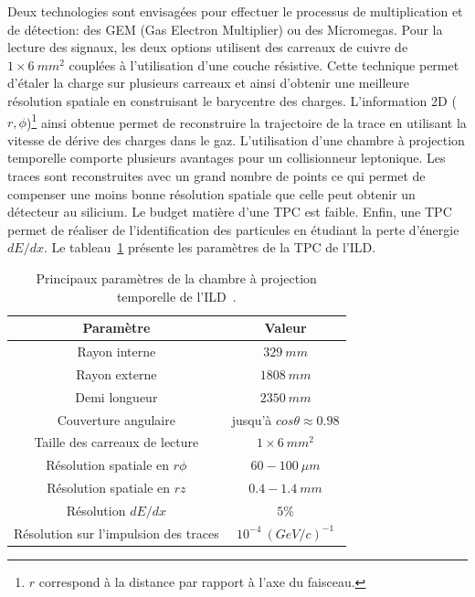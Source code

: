 Deux technologies sont envisagées pour effectuer le processus de multiplication et de détection: des GEM (Gas Electron Multiplier) ou des Micromegas. Pour la lecture des signaux, les deux options utilisent des carreaux de cuivre de $1\times6~mm^2$ couplées à l'utilisation d'une couche résistive. Cette technique permet d'étaler la charge sur plusieurs carreaux et ainsi d'obtenir une meilleure résolution spatiale en construisant le barycentre des charges. L'information 2D ($r,\phi$)\footnote{$r$ correspond à la distance par rapport à l'axe du faisceau.} ainsi obtenue permet de reconstruire la trajectoire de la trace en utilisant la vitesse de dérive des charges dans le gaz. L'utilisation d'une chambre à projection temporelle comporte plusieurs avantages pour un collisionneur leptonique. Les traces sont reconstruites avec un grand nombre de points ce qui permet de compenser une moins bonne résolution spatiale que celle peut obtenir un détecteur au silicium. Le budget matière d'une TPC est faible. Enfin, une TPC permet de réaliser de l'identification des particules en étudiant la perte d'énergie $dE/dx$. Le tableau~\ref{tab.tpc-params} présente les paramètres de la TPC de l'ILD.
\begin{table}[!ht]
  \begin{center}
    \begin{tabular}{c|c}
      \rowcolor{black!20!white} Paramètre & Valeur \\
      \hline
      \rowcolor{black!5!white} Rayon interne & $329~mm$ \\
      \rowcolor{black!5!white} Rayon externe & $1808~mm$ \\
      \rowcolor{black!5!white} Demi longueur & $2350~mm$ \\
      \rowcolor{black!5!white} Couverture angulaire & jusqu'à $cos\theta\approx0.98$ \\
      \rowcolor{black!5!white} Taille des carreaux de lecture & $1\times6~mm^2$ \\
      \hline
      \rowcolor{black!5!white} Résolution spatiale en $r\phi$ & $60-100~\mu m$ \\
      \rowcolor{black!5!white} Résolution spatiale en $rz$ & $0.4-1.4~mm$ \\
      \rowcolor{black!5!white} Résolution $dE/dx$ & $5\%$ \\
      \rowcolor{black!5!white} Résolution sur l'impulsion des traces & $10^{-4}~(GeV/c)^{-1}$ \\
    \end{tabular}
  \end{center}  
  \caption{Principaux paramètres de la chambre à projection temporelle de l'ILD~\cite{detectorTDR}.}
  \label{tab.tpc-params}
\end{table}

